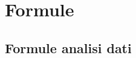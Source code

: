 \documentclass[a4paper,10pt]{article}                                                                                       %
\begin{document}
\section{Formule}                                                                                                           %
\label{sec:formulas}                                                                                                        %
\subsection{Formule analisi dati}                                                                                           %
\label{subsec:da_formulas}                                                                                                  %
\end{document}
